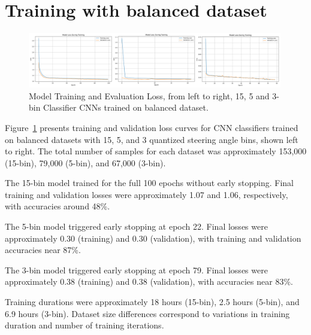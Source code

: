 
\section{Training with balanced dataset}

\begin{figure}[h]
\centering
\includegraphics[width=0.99\textwidth]{Figures/Results/CNN_15_5_3_balanced_training.png}
\caption{Model Training and Evaluation Loss, from left to right, 15, 5 and 3-bin Classifier CNNs trained on balanced dataset.}
\label{fig:CNN_15_5_3_balanced_training}
\end{figure}

Figure~\ref{fig:CNN_15_5_3_balanced_training} presents training and validation loss curves for CNN classifiers trained on balanced datasets with 15, 5, and 3 quantized steering angle bins, shown left to right. The total number of samples for each dataset was approximately 153,000 (15-bin), 79,000 (5-bin), and 67,000 (3-bin).

The 15-bin model trained for the full 100 epochs without early stopping. Final training and validation losses were approximately 1.07 and 1.06, respectively, with accuracies around 48\%.

The 5-bin model triggered early stopping at epoch 22. Final losses were approximately 0.30 (training) and 0.30 (validation), with training and validation accuracies near 87\%.

The 3-bin model triggered early stopping at epoch 79. Final losses were approximately 0.38 (training) and 0.38 (validation), with accuracies near 83\%.

Training durations were approximately 18 hours (15-bin), 2.5 hours (5-bin), and 6.9 hours (3-bin). Dataset size differences correspond to variations in training duration and number of training iterations.





